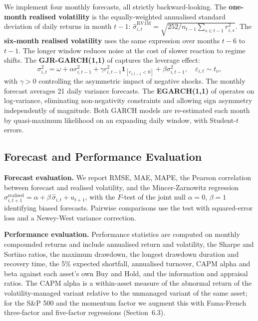 \documentclass[12pt, a4paper]{article}
\newcommand{\shat}{\hat{\sigma}}
\begin{document}
We implement four monthly forecasts, all strictly backward-looking. The
\textbf{one-month realised volatility} is the equally-weighted annualised standard
deviation of daily returns in month $t-1$:
$\shat^{\mathrm{RV1M}}_{i,t} = \sqrt{252/n_{t-1}\sum_{s\in t-1} r_{i,s}^2}$. The
\textbf{six-month realised volatility} uses the same expression over months $t-6$ to
$t-1$. The longer window reduces noise at the cost of slower reaction to regime shifts.
The \textbf{GJR-GARCH(1,1)} of \citet{glosten1993} captures the leverage effect:
\begin{equation}
\sigma_{i,t}^2 = \omega + \alpha r_{i,t-1}^2 + \gamma r_{i,t-1}^2 \mathbf{1}_{[r_{i,t-1}<0]} + \beta\sigma_{i,t-1}^2,
\quad \varepsilon_{i,t}\sim t_\nu,
\end{equation}
with $\gamma>0$ controlling the asymmetric impact of negative shocks. The monthly forecast
averages 21 daily variance forecasts. The \textbf{EGARCH(1,1)} of \citet{nelson1991}
operates on log-variance, eliminating non-negativity constraints and allowing sign
asymmetry independently of magnitude. Both GARCH models are re-estimated each month by
quasi-maximum likelihood on an expanding daily window, with Student-$t$ errors.

\subsection{Forecast and Performance Evaluation}

\textbf{Forecast evaluation.} We report RMSE, MAE, MAPE, the Pearson correlation between
forecast and realised volatility, and the Mincer-Zarnowitz regression
$\sigma^{\mathrm{realised}}_{i,t+1} = \alpha + \beta\,\shat_{i,t} + u_{t+1}$, with the
$F$-test of the joint null $\alpha=0$, $\beta=1$ identifying biased forecasts. Pairwise
comparisons use the \citet{diebold1995} test with squared-error loss and a Newey-West
variance correction.

\textbf{Performance evaluation.} Performance statistics are computed on monthly compounded
returns and include annualised return and volatility, the Sharpe and Sortino ratios, the
maximum drawdown, the longest drawdown duration and recovery time, the 5\% expected
shortfall, annualised turnover, CAPM alpha and beta against each asset's own Buy and Hold,
and the information and appraisal ratios. The CAPM alpha is a within-asset measure of the
abnormal return of the volatility-managed variant relative to the unmanaged variant of the
same asset; for the S\&P 500 and the momentum factor we augment this with Fama-French
three-factor and five-factor regressions (Section~6.3).
\end{document}
